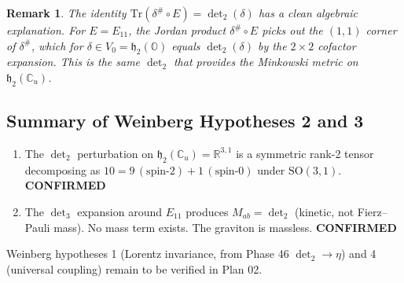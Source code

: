 \documentclass[11pt]{article}
\newtheorem{remark}{Remark}
\newcommand{\Tr}{\mathrm{Tr}}
\newcommand{\h}{\mathfrak{h}}
\begin{document}
\begin{remark}
The identity $\Tr(\delta^\# \circ E) = \det_2(\delta)$ has a clean algebraic
explanation. For $E = E_{11}$, the Jordan product $\delta^\# \circ E$
picks out the $(1,1)$ corner of $\delta^\#$, which for $\delta \in V_0 = \h_2(\mathbb{O})$
equals $\det_2(\delta)$ by the $2 \times 2$ cofactor expansion. This is
the same $\det_2$ that provides the Minkowski metric on $\h_2(\mathbb{C}_u)$.
\end{remark}

\subsection{Summary of Weinberg Hypotheses 2 and 3}

\begin{enumerate}
\item[\textbf{W2} (Spin-2):] The $\det_2$ perturbation on
  $\h_2(\mathbb{C}_u) = \mathbb{R}^{3,1}$ is a symmetric rank-2
  tensor decomposing as $10 = 9\,(\text{spin-2}) + 1\,(\text{spin-0})$
  under $\mathrm{SO}(3,1)$.
  \hfill \textbf{CONFIRMED}

\item[\textbf{W3} (Massless):] The $\det_3$ expansion around $E_{11}$
  produces $M_{ab} = \det_2$ (kinetic, not Fierz--Pauli mass).
  No mass term exists. The graviton is massless.
  \hfill \textbf{CONFIRMED}
\end{enumerate}

Weinberg hypotheses 1 (Lorentz invariance, from Phase 46 $\det_2 \to \eta$)
and 4 (universal coupling) remain to be verified in Plan 02.
\end{document}
